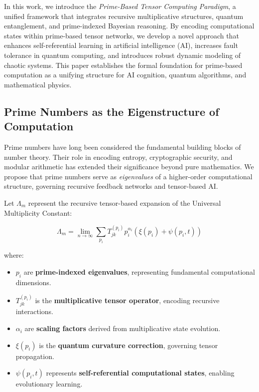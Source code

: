 \documentclass{article}
\theoremstyle{plain}
\theoremstyle{plain}
\theoremstyle{definition}
\theoremstyle{remark}
\begin{document}
In this work, we introduce the \textit{Prime-Based Tensor Computing Paradigm}, a unified framework that integrates recursive multiplicative structures, quantum entanglement, and prime-indexed Bayesian reasoning. By encoding computational states within prime-based tensor networks, we develop a novel approach that enhances self-referential learning in artificial intelligence (AI), increases fault tolerance in quantum computing, and introduces robust dynamic modeling of chaotic systems. This paper establishes the formal foundation for prime-based computation as a unifying structure for AI cognition, quantum algorithms, and mathematical physics.

\subsection{Prime Numbers as the Eigenstructure of Computation}

Prime numbers have long been considered the fundamental building blocks of number theory. Their role in encoding entropy, cryptographic security, and modular arithmetic has extended their significance beyond pure mathematics. We propose that prime numbers serve as \textit{eigenvalues} of a higher-order computational structure, governing recursive feedback networks and tensor-based AI.

Let $\Lambda_m$ represent the recursive tensor-based expansion of the Universal Multiplicity Constant:

\begin{equation}
\Lambda_m = \lim_{n\to\infty} \sum_{p_i} T^{(p_i)}_{jk} p_i^{\alpha_i} (\xi(p_i) + \psi(p_i, t))
\end{equation}

where:
\begin{itemize}
    \item $p_i$ are \textbf{prime-indexed eigenvalues}, representing fundamental computational dimensions.
    \item $T^{(p_i)}_{jk}$ is the \textbf{multiplicative tensor operator}, encoding recursive interactions.
    \item $\alpha_i$ are \textbf{scaling factors} derived from multiplicative state evolution.
    \item $\xi(p_i)$ is the \textbf{quantum curvature correction}, governing tensor propagation.
    \item $\psi(p_i, t)$ represents \textbf{self-referential computational states}, enabling evolutionary learning.
\end{itemize}
\end{document}
